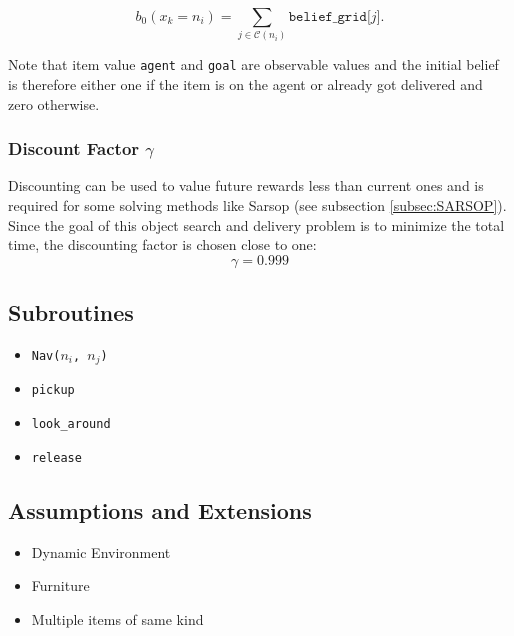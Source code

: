 \begin{equation}
b_0\left(x_k=n_i\right) = \sum_{j\in \mathcal{C}(n_i)}\texttt{belief\_grid[$j$]}.
\end{equation}

Note that item value \texttt{agent} and \texttt{goal} are observable values and the initial belief is therefore either one if the item is on the agent or already got delivered and zero otherwise. 

\subsubsection{Discount Factor $\gamma$}
Discounting can be used to value future rewards less than current ones and is required for some solving methods like Sarsop (see subsection \ref{subsec:SARSOP}). Since the goal of this object search and delivery problem is to minimize the total time, the discounting factor is chosen close to one:
\begin{equation}
    \gamma = 0.999
\end{equation}

\subsection{Subroutines}\label{subsec:subroutine}
\begin{itemize}
    \item \texttt{Nav($n_i$, $n_j$)}
    \item \texttt{pickup}
    \item \texttt{look\_around}
    \item \texttt{release}
\end{itemize}
\subsection{Assumptions and Extensions}
\begin{itemize}
    \item Dynamic Environment
    \item Furniture
    \item Multiple items of same kind
\end{itemize}

